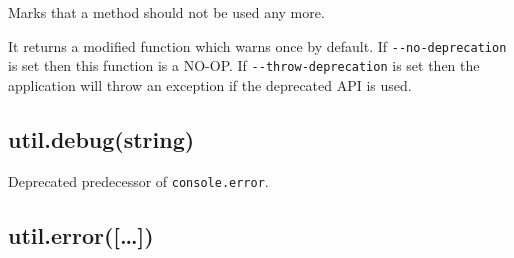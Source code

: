 Marks that a method should not be used any more.

\begin{Shaded}
\begin{Highlighting}[]
 \NormalTok{= }\NormalTok{(}\NormalTok{() \{}
   \NormalTok{(} 
    \NormalTok{);}
  \NormalTok{\}}
\NormalTok{\}, }\NormalTok{)}
\end{Highlighting}
\end{Shaded}

It returns a modified function which warns once by default. If
\texttt{-\/-no-deprecation} is set then this function is a NO-OP. If
\texttt{-\/-throw-deprecation} is set then the application will throw an
exception if the deprecated API is used.

\subsection{util.debug(string)}\label{util.debugstring}

\begin{Shaded}
\begin{Highlighting}[]
 \NormalTok{() }
\end{Highlighting}
\end{Shaded}

Deprecated predecessor of \texttt{console.error}.

\subsection{util.error({[}\ldots{}{]})}\label{util.error}

\begin{Shaded}
\begin{Highlighting}[]
 \NormalTok{() }
\end{Highlighting}
\end{Shaded}

